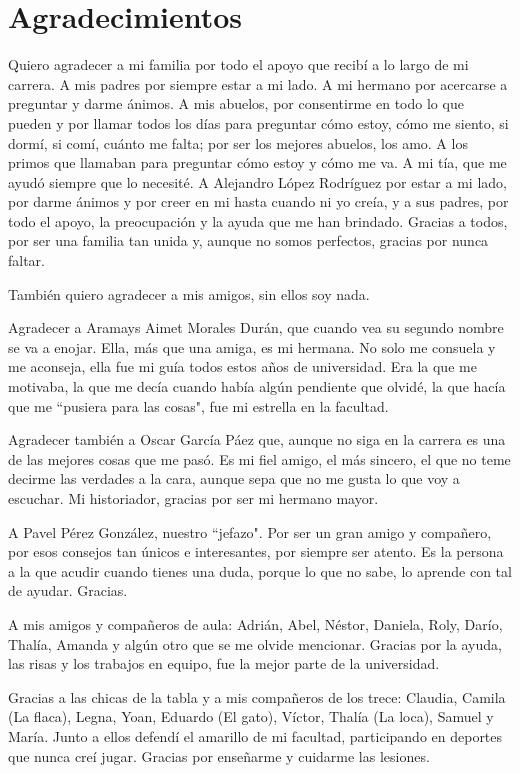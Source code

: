 \chapter*{Agradecimientos}
Quiero agradecer a mi familia por todo el apoyo que recibí a lo largo de mi carrera. A mis padres por siempre estar a mi lado. A mi hermano por acercarse a preguntar y darme ánimos. A mis abuelos, por consentirme en todo lo que pueden y por llamar todos los días para preguntar cómo estoy, cómo me siento, si dormí, si comí, cuánto me falta; por ser los mejores abuelos, los amo. A los primos que llamaban para preguntar cómo estoy y cómo me va. A mi tía, que me ayudó siempre que lo necesité. A Alejandro López Rodríguez por estar a mi lado, por darme ánimos y por creer en mi hasta cuando ni yo creía, y a sus padres, por todo el apoyo, la preocupación y la ayuda que me han brindado. Gracias a todos, por ser una familia tan unida y, aunque no somos perfectos, gracias por nunca faltar.

También quiero agradecer a mis amigos, sin ellos soy nada.

Agradecer a Aramays Aimet Morales Durán, que cuando vea su segundo nombre se va a enojar. Ella, más que una amiga, es mi hermana. No solo me consuela y me aconseja, ella fue mi guía todos estos años de universidad. Era la que me motivaba, la que me decía cuando había algún pendiente que olvidé, la que hacía que me ``pusiera para las cosas", fue mi estrella en la facultad.

Agradecer también a Oscar García Páez que, aunque no siga en la carrera es una de las mejores cosas que me pasó. Es mi fiel amigo, el más sincero, el que no teme decirme las verdades a la cara, aunque sepa que no me gusta lo que voy a escuchar. Mi historiador, gracias por ser mi hermano mayor.

A Pavel Pérez González, nuestro ``jefazo". Por ser un gran amigo y compañero, por esos consejos tan únicos e interesantes, por siempre ser atento. Es la persona a la que acudir cuando tienes una duda, porque lo que no sabe, lo aprende con tal de ayudar. Gracias.

A mis amigos y compañeros de aula: Adrián, Abel, Néstor, Daniela, Roly, Darío, Thalía, Amanda y algún otro que se me olvide mencionar. Gracias por la ayuda, las risas y los trabajos en equipo, fue la mejor parte de la universidad.

Gracias a las chicas de la tabla y a mis compañeros de los trece: Claudia, Camila (La flaca), Legna, Yoan, Eduardo (El gato), Víctor, Thalía (La loca), Samuel y María. Junto a ellos defendí el amarillo de mi facultad, participando en deportes que nunca creí jugar. Gracias por enseñarme y cuidarme las lesiones.


